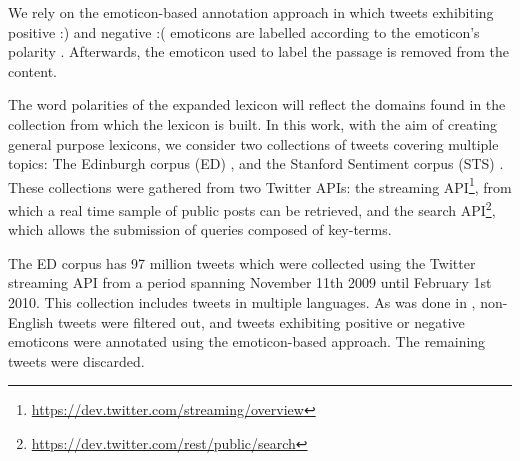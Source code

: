 \documentclass{sig-alternate}
\begin{document}
We rely on the emoticon-based annotation approach in which tweets exhibiting positive :) and negative :( emoticons are labelled according to the emoticon's polarity \cite{go2010}. Afterwards, the emoticon used to label the passage is removed from the content.




The word polarities of the expanded lexicon will reflect the domains found in the collection from which the lexicon is built.  In this work, with the aim of creating general purpose lexicons, we consider two  collections of tweets covering multiple topics: The Edinburgh corpus (ED) \cite{Petrovic2010}, and the Stanford Sentiment corpus (STS) \cite{go2010}. These collections were gathered from  two Twitter APIs: the streaming API\footnote{\url{https://dev.twitter.com/streaming/overview}}, from which a real time sample of public posts can be retrieved, and the search API\footnote{\url{https://dev.twitter.com/rest/public/search}}, which allows the submission of queries composed of key-terms.

The ED corpus has 97 million tweets which were collected using the Twitter streaming API from a period spanning November 11th 2009 until February 1st 2010. This collection includes tweets in multiple languages. As was done in \cite{bifet2010}, non-English tweets were filtered out, and tweets exhibiting positive or negative emoticons were annotated using the emoticon-based approach. The remaining tweets were discarded.
\end{document}
